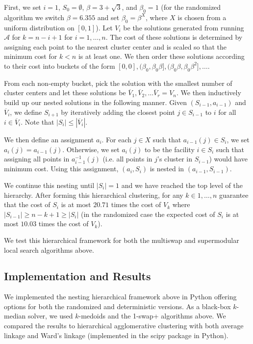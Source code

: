 \documentclass{article}
\begin{document}
First, we set $i=1$, $S_0 = \emptyset$, $\beta = 3+\sqrt{3}$, and $\beta_0 = 1$ (for the randomized algorithm we switch $\beta = 6.355$ and set $\beta_0 = \beta^X$, where $X$ is chosen from a uniform distribution on $[0,1]$). Let $V_i$ be the solutions generated from running $\mathcal{A}$ for $k=n-i+1$ for $i=1, \ldots, n$. The cost of these solutions is determined by assigning each point to the nearest cluster center and is scaled so that the minimum cost for $k<n$ is at least one. We then order these solutions according to their cost into buckets of the form $[0,0], (\beta_0, \beta_0 \beta], (\beta_0 \beta, \beta_0 \beta^2], \ldots $. 

From each non-empty bucket, pick the solution with the smallest number of cluster centers and let these solutions be $\overline{V}_1, \overline{V}_2, \ldots \overline{V}_r = V_n$. We then inductively build up our nested solutions in the following manner. Given $(S_{i-1}, a_{i-1})$ and $\overline{V}_i$, we define $S_{i+1}$ by iteratively adding the closest point $j \in S_{i-1}$ to $i$ for all $i \in \overline{V}_i$. Note that $|S_{i}| \leq |\overline{V}_i|$. 

We then define an assignment $a_i$. For each $j \in X$ such that $a_{i-1}(j) \in S_{i}$, we set $a_i(j) = a_{i-1}(j)$. Otherwise, we set $a_i(j)$ to be the facility $i \in S_i$ such that assigning all points in $a_{i-1}^{-1}(j)$ (i.e. all points in $j$'s cluster in $S_{i-1}$) would have minimum cost. Using this assignment, $(a_i, S_i)$ is nested in $(a_{i-1}, S_{i-1})$. 

We continue this nesting until $|S_i| = 1$ and we have reached the top level of the hierarchy. After forming this hierarchical clustering, for any $k \in 1, \ldots, n$ \cite{Lin} guarantee that the cost of $S_i$ is at most $20.71$ times the cost of $V_k$ where $|S_{i-1}| \geq n-k+1 \geq |S_{i}|$ (in the randomized case the expected cost of $S_i$ is at most $10.03$ times the cost of $V_k$).

We test this hierarchical framework for both the multiswap and supermodular local search algorithms above. 

\subsection{Implementation and Results}
We implemented the nesting hierarchical framework above in Python offering options for both the randomized and deterministic versions. As a black-box $k$-median solver, we used $k$-medoids and the 1-swap+ algorithms above. We compared the results to hierarchical agglomerative clustering with both average linkage and Ward's linkage (implemented in the scipy package in Python). 
\end{document}
